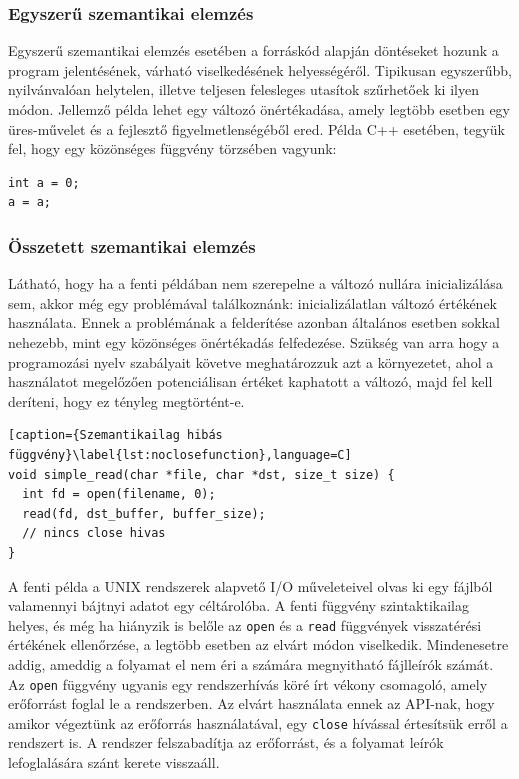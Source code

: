\documentclass[a4paper,12pt]{report}
\begin{document}
\subsubsection{Egyszerű szemantikai elemzés}
Egyszerű szemantikai elemzés esetében a forráskód alapján döntéseket hozunk a program jelentésének, várható viselkedésének helyességéről. Tipikusan egyszerűbb, nyilvánvalóan helytelen, illetve teljesen felesleges utasítok szűrhetőek ki ilyen módon. Jellemző példa lehet egy változó önértékadása, amely legtöbb esetben egy üres-művelet és a fejlesztő figyelmetlenségéből ered.
Példa C++ esetében, tegyük fel, hogy egy közönséges függvény törzsében vagyunk:
\begin{lstlisting}
int a = 0;
a = a;
\end{lstlisting}
\subsubsection{Összetett szemantikai elemzés}
Látható, hogy ha a fenti példában nem szerepelne a változó nullára inicializálása sem, akkor még egy problémával találkoznánk: inicializálatlan változó értékének használata. Ennek a problémának a felderítése azonban általános esetben sokkal nehezebb, mint egy közönséges önértékadás felfedezése. Szükség van arra hogy a programozási nyelv szabályait követve meghatározzuk azt a környezetet, ahol a használatot megelőzően potenciálisan értéket kaphatott a változó, majd fel kell deríteni, hogy ez tényleg megtörtént-e.
\begin{lstlisting}[caption={Szemantikailag hibás függvény}\label{lst:noclosefunction},language=C]
void simple_read(char *file, char *dst, size_t size) {
  int fd = open(filename, 0);
  read(fd, dst_buffer, buffer_size);
  // nincs close hivas
}
\end{lstlisting}
A fenti példa a UNIX rendszerek alapvető I/O műveleteivel olvas ki egy fájlból valamennyi bájtnyi adatot egy céltárolóba. A fenti függvény szintaktikailag helyes, és még ha hiányzik is belőle az \texttt{open} és a \texttt{read} függvények visszatérési értékének ellenőrzése, a legtöbb esetben az elvárt módon viselkedik. Mindenesetre addig, ameddig a folyamat el nem éri a számára megnyitható fájlleírók számát. Az \texttt{open} függvény ugyanis egy rendszerhívás köré írt vékony csomagoló, amely erőforrást foglal le a rendszerben. Az elvárt használata ennek az API-nak, hogy amikor végeztünk az erőforrás használatával, egy \texttt{close} hívással értesítsük erről a rendszert is. A rendszer felszabadítja az erőforrást, és a folyamat leírók lefoglalására szánt kerete visszaáll.
\end{document}
